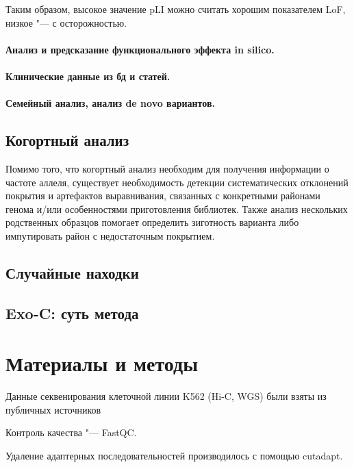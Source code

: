 \documentclass[a4paper,12pt]{article}
\begin{document}
Таким образом, высокое значение pLI можно считать хорошим показателем LoF, низкое "--- с осторожностью.

\paragraph{Анализ и предсказание функционального эффекта in silico.}

\paragraph{Клинические данные из бд и статей.}

\paragraph{Семейный анализ, анализ de novo вариантов.}

\subsection{Когортный анализ}

Помимо того, что когортный анализ необходим для получения информации о частоте аллеля, существует необходимость детекции систематических отклонений покрытия и артефактов выравнивания, связанных с конкретными районами генома и/или особенностями приготовления библиотек. Также анализ нескольких родственных образцов помогает определить зиготность варианта либо импутировать район с недостаточным покрытием.

\subsection{Случайные находки}

\subsection{Exo-C: суть метода}

\section{Материалы и методы}

Данные секвенирования клеточной линии K562 (Hi-C\cite{rao}, WGS\cite{zhou}) были взяты из публичных источников

Контроль качества "--- FastQC\cite{fastqc}.

Удаление адаптерных последовательностей производилось с помощью cutadapt\cite{cutadapt}.
\end{document}
